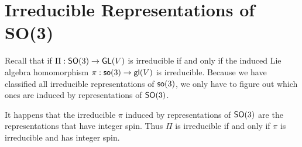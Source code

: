 \section{Irreducible Representations of SO(3)}
Recall that if $\Pi: \operatorname{\textsf{SO}}(3) \rightarrow \operatorname{\textsf{GL}}(V)$ is irreducible if and only if the induced Lie algebra homomorphism $\pi: \operatorname{\textsf{so}}(3) \rightarrow \operatorname{\textsf{gl}}(V)$ is irreducible. Because we have classified all irreducible representations of $\operatorname{\textsf{so}}(3)$, we only have to figure out which ones are induced by representations of $\operatorname{\textsf{SO}}(3)$.

It happens that the irreducible $\pi$ induced by representations of $\operatorname{\textsf{SO}}(3)$ are the representations that have integer spin. Thus $\Pi$ is irreducible if and only if $\pi$ is irreducible and has integer spin.
